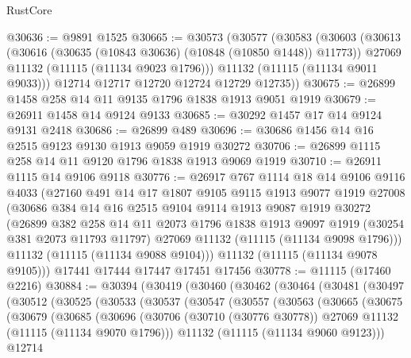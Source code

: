 \begin{lexlean}{RustCore}
\begin{coremodule}
@30636 := @9891 @1525
@30665 := @30573
    (@30577
      (@30583
        (@30603
          (@30613
            (@30616 (@30635 (@10843 @30636) (@10848 (@10850 @1448)) @11773))
            @27069
            @11132
            (@11115 (@11134 @9023 @1796)))
          @11132
          (@11115 (@11134 @9011 @9033)))
        @12714
        @12717
        @12720
        @12724
        @12729
        @12735))
@30675 := @26899 @1458 @258 @14 @11 @9135 @1796 @1838 @1913 @9051 @1919
@30679 := @26911 @1458 @14 @9124 @9133
@30685 := @30292 @1457 @17 @14 @9124 @9131 @2418
@30686 := @26899 @489
@30696 := @30686 @1456 @14 @16 @2515 @9123 @9130 @1913 @9059 @1919 @30272
@30706 := @26899 @1115 @258 @14 @11 @9120 @1796 @1838 @1913 @9069 @1919
@30710 := @26911 @1115 @14 @9106 @9118
@30776 := @26917
    @767
    @1114
    @18
    @14
    @9106
    @9116
    @4033
    (@27160
      @491
      @14
      @17
      @1807
      @9105
      @9115
      @1913
      @9077
      @1919
      @27008
      (@30686
        @384
        @14
        @16
        @2515
        @9104
        @9114
        @1913
        @9087
        @1919
        @30272
        (@26899
          @382
          @258
          @14
          @11
          @2073
          @1796
          @1838
          @1913
          @9097
          @1919
          (@30254 @381 @2073 @11793 @11797)
          @27069
          @11132
          (@11115 (@11134 @9098 @1796)))
        @11132
        (@11115 (@11134 @9088 @9104)))
      @11132
      (@11115 (@11134 @9078 @9105)))
    @17441
    @17444
    @17447
    @17451
    @17456
@30778 := @11115 (@17460 @2216)
@30884 := @30394
    (@30419
      (@30460
        (@30462
          (@30464
            (@30481
              (@30497
                (@30512
                  (@30525
                    (@30533
                      (@30537
                        (@30547
                          (@30557
                            (@30563
                              (@30665
                                (@30675
                                  (@30679
                                    (@30685
                                      (@30696
                                        (@30706
                                          (@30710 (@30776 @30778))
                                          @27069
                                          @11132
                                          (@11115 (@11134 @9070 @1796)))
                                        @11132
                                        (@11115 (@11134 @9060 @9123)))
                                      @12714

\end{coremodule}
\end{lexlean}
